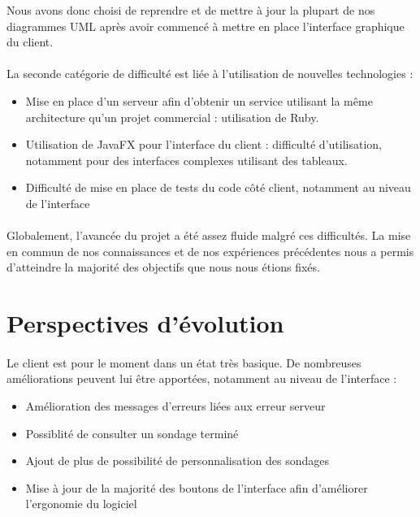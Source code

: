 \documentclass[titlepage]{report}
\begin{document}
\par{} Nous avons donc choisi de reprendre et de mettre à jour la plupart de nos diagrammes UML après avoir commencé à mettre en place l'interface graphique du client. 

\paragraph{} La seconde catégorie de difficulté est liée à l'utilisation de nouvelles technologies : \begin{itemize}
	\item Mise en place d'un serveur afin d'obtenir un service utilisant la même architecture qu'un projet commercial : utilisation de Ruby.
	\item Utilisation de JavaFX pour l'interface du client : difficulté d'utilisation, notamment pour des interfaces complexes utilisant des tableaux.
	\item Difficulté de mise en place de tests du code côté client, notamment au niveau de l'interface
\end{itemize}

\paragraph{} Globalement, l'avancée du projet a été assez fluide malgré ces difficultés. La mise en commun de nos connaissances et de nos expériences précédentes nous a permis d'atteindre la majorité des objectifs que nous nous étions fixés.

\section{Perspectives d'évolution}

\paragraph{} Le client est pour le moment dans un état très basique. De nombreuses améliorations peuvent lui être apportées, notamment au niveau de l'interface : \begin{itemize}
	\item Amélioration des messages d'erreurs liées aux erreur serveur
	\item Possiblité de consulter un sondage terminé
	\item Ajout de plus de possibilité de personnalisation des sondages
	\item Mise à jour de la majorité des boutons de l'interface afin d'améliorer l'ergonomie du logiciel
\end{itemize}
\end{document}
